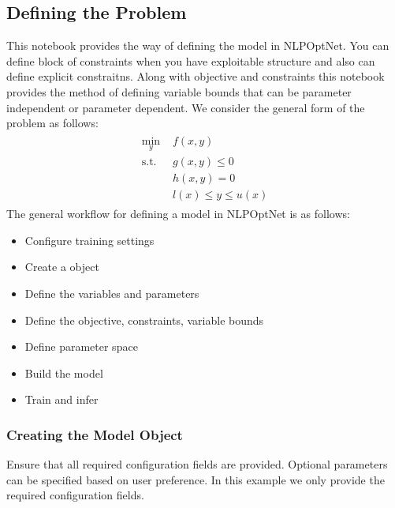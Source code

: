 \documentclass[letterpaper,10pt,english,openany,oneside]{sphinxmanual}
\begin{document}
\subsection{Defining the Problem}
\label{\detokenize{user-guide/defining-the-problem:defining-the-problem}}\label{\detokenize{user-guide/defining-the-problem::doc}}
\sphinxAtStartPar
This notebook provides the way of defining the model in NLPOpt\sphinxhyphen{}Net. You can define block of constraints when you have exploitable structure and also can define explicit constraitns. Along with objective and constraints this notebook provides the method of defining variable bounds that can be parameter independent or parameter dependent. We consider the general form of the problem as follows:
\begin{equation*}
\begin{split}\begin{aligned}
\min_y &\,\, f(x,y)\\
\textrm{s.t.} &\, \, g(x,y) \leq 0 \\
&\, \, h(x,y) = 0 \\
&\, \, l(x) \leq y \leq u(x)
\end{aligned}\end{split}
\end{equation*}
\sphinxAtStartPar
The general workflow for defining a model in NLPOpt\sphinxhyphen{}Net is as follows:
\begin{itemize}
\item {} 
\sphinxAtStartPar
Configure training settings

\item {} 
\sphinxAtStartPar
Create a  object

\item {} 
\sphinxAtStartPar
Define the variables and parameters

\item {} 
\sphinxAtStartPar
Define the objective, constraints, variable bounds

\item {} 
\sphinxAtStartPar
Define parameter space

\item {} 
\sphinxAtStartPar
Build the model

\item {} 
\sphinxAtStartPar
Train and infer

\end{itemize}


\subsubsection{Creating the Model Object}
\label{\detokenize{user-guide/defining-the-problem:creating-the-model-object}}
\sphinxAtStartPar
Ensure that all required configuration fields are provided. Optional parameters can be specified based on user preference. In this example we only provide the required configuration fields.
\end{document}
